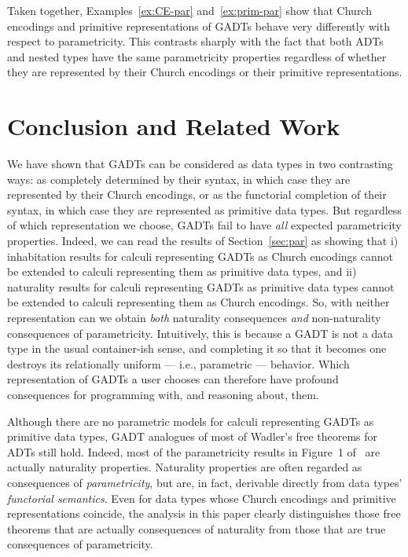\documentclass[acmsmall,screen,review,anonymous]{acmart}
\theoremstyle{definition}
\begin{document}
Taken together, Examples~\ref{ex:CE-par} and~\ref{ex:prim-par} show
that Church encodings and primitive representations of GADTs behave
very differently with respect to parametricity.  This contrasts
sharply with the fact that both ADTs and nested types have the same
parametricity properties regardless of whether they are represented by
their Church encodings or their primitive
representations. 

\section{Conclusion and Related Work}

We have shown that GADTs can be considered as data types in two
contrasting ways: as completely determined by their syntax, in which
case they are represented by their Church encodings, or as the
functorial completion of their syntax, in which case they are
represented as primitive data types.  But regardless of which
representation we choose, GADTs fail to have {\em all} expected
parametricity properties. Indeed, we can read the results of
Section~\ref{sec:par} as showing that i)
inhabitation results for calculi representing GADTs as Church
encodings cannot be extended to calculi representing them as primitive
data types, and ii)
naturality results
for calculi representing GADTs as primitive data types cannot be
extended to calculi representing them as Church encodings. So, with
neither representation can we obtain {\em both} naturality
consequences {\em and} non-naturality consequences of
parametricity. Intuitively, this is because a GADT is not a data type
in the usual container-ish sense, and completing it so that it becomes
one destroys its relationally uniform --- i.e., parametric ---
behavior.
Which representation of GADTs a user chooses can therefore have
profound consequences for programming with, and reasoning about, them.

Although there are no parametric models for calculi representing GADTs
as primitive data types, GADT analogues of most of Wadler's free
theorems for ADTs still hold.
Indeed, most of the parametricity results in Figure~1 of~\cite{wad89}
are actually naturality properties.
Naturality properties are often regarded as consequences of {\em
  parametricity}, but are, in fact, derivable directly from data
types' {\em functorial semantics}. Even for data types whose Church
encodings and primitive representations coincide, the analysis in this
paper clearly distinguishes those free theorems that are actually
consequences of naturality from those that are true consequences of
parametricity.
\end{document}
